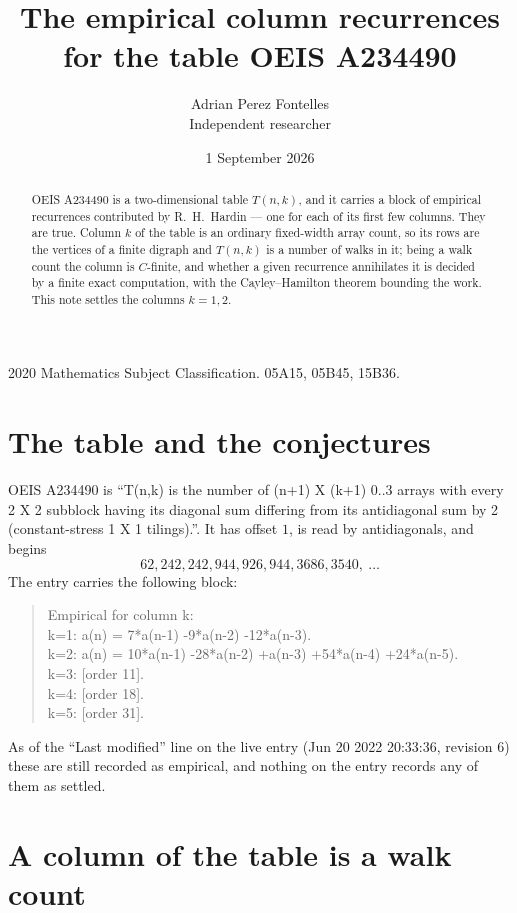 \documentclass[11pt,a4paper]{article}
\title{The empirical column recurrences for the table OEIS A234490}
\author{Adrian Perez Fontelles\\ \small Independent researcher}
\date{1 September 2026}
\theoremstyle{plain}
\theoremstyle{definition}
\begin{document}
\maketitle

\begin{abstract}
OEIS A234490 is a two-dimensional table $T(n,k)$, and it carries a block of empirical
recurrences contributed by R.~H.~Hardin --- one for each of its first few columns. They are
true. Column $k$ of the table is an ordinary fixed-width array count, so its rows are the
vertices of a finite digraph and $T(n,k)$ is a number of walks in it; being a walk count the
column is $C$-finite, and whether a given recurrence annihilates it is decided by a finite
exact computation, with the Cayley--Hamilton theorem bounding the work. This note settles the
columns $k=1, 2$.
\end{abstract}

\noindent\small 2020 Mathematics Subject Classification. 05A15, 05B45, 15B36.\normalsize

\section{The table and the conjectures}

OEIS A234490 is ``T(n,k) is the number of (n+1) X (k+1) 0..3 arrays with every 2 X 2 subblock having its diagonal sum differing from its antidiagonal sum by 2 (constant-stress 1 X 1 tilings).''. It has offset $1$, is
read by antidiagonals, and begins
\[
62, 242, 242, 944, 926, 944, 3686, 3540,\ \dots
\]
The entry carries the following block:
\begin{quote}\small
Empirical for column k:\\
k=1: a(n) = 7*a(n-1) -9*a(n-2) -12*a(n-3).\\
k=2: a(n) = 10*a(n-1) -28*a(n-2) +a(n-3) +54*a(n-4) +24*a(n-5).\\
k=3: [order 11].\\
k=4: [order 18].\\
k=5: [order 31].\\
\end{quote}
As of the ``Last modified'' line on the live entry (Jun 20 2022 20:33:36, revision 6) these are still
recorded as empirical, and nothing on the entry records any of them as settled.

\section{A column of the table is a walk count}
\end{document}
